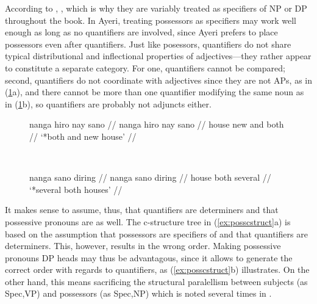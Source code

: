 According to \citet{bresnan2016}, , which is why they are variably
treated as specifiers of NP or DP throughout the book. In Ayeri, treating
possessors as specifiers may work well enough as long as no quantifiers are
involved, since Ayeri prefers to place possessors even after quantifiers. Just
like posessors, quantifiers do not share typical distributional and
inflectional properties of adjectives---they rather appear to constitute a
separate category. For one, quantifiers cannot be compared; second, quantifiers
do not coordinate with adjectives since they are not APs, as in
(\ref{ex:quantnoadj}a), and there cannot be more than one quantifier modifying
the same noun as in (\ref{ex:quantnoadj}b), so quantifiers are probably not
adjuncts either.

\begin{figure}[h]
\ex{}\label{ex:quantnoadj}
\begin{minipage}[t]{.5\remaining}
\tl\quad\ljudge*\begingl
	\gla nanga hiro nay sano //
	\glb nanga hiro nay sano //
	\glc house new and both //
	\glft `*both and new house' //
\endgl
\end{minipage}
~
\begin{minipage}[t]{.5\remaining}
\tl\quad\ljudge*\begingl
	\gla nanga sano diring //
	\glb nanga sano diring //
	\glc house both several //
	\glft `*several both houses' //
\endgl
\end{minipage}
\xe
\end{figure}

It makes sense to assume, thus, that quantifiers are determiners and that
possessive pronouns are as well. The c-structure tree in
(\ref{ex:posscstruct}a) is based on the assumption that possessors are
specifiers of  and that quantifiers are determiners. This, however,
results in the wrong order. Making possessive pronouns DP heads may thus be
advantagous, since it allows to generate the correct order with regards to
quantifiers, as (\ref{ex:posscstruct}b) illustrates. On the other hand, this
means sacrificing the structural paralellism between subjects (as Spec,VP) and
possessors (as Spec,NP) which is noted several times in \citet{bresnan2016}.


